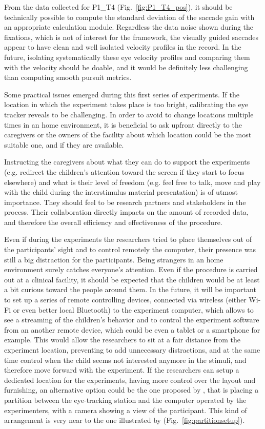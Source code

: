 From the data collected for P1\_T4 (Fig.~\ref{fig:P1_T4_pos}), it should be technically possible to compute the standard deviation of the saccade gain with an appropriate calculation module. Regardless the data noise shown during the fixations, which is not of interest for the framework, the visually guided saccades appear to have clean and well isolated velocity profiles in the record. In the future, isolating systematically these eye velocity profiles and comparing them with the velocity should be doable, and it would be definitely less challenging than computing smooth pursuit metrics.

Some practical issues emerged during this first series of experiments. If the location in which the experiment takes place is too bright, calibrating the eye tracker reveals to be challenging. In order to avoid to change locations multiple times in an home environment, it is beneficial to ask upfront directly to the caregivers or the owners of the facility about which location could be the most suitable one, and if they are available.

Instructing the caregivers about what they can do to support the experiments (e.g. redirect the children’s attention toward the screen if they start to focus elsewhere) and what is their level of freedom (e.g. feel free to talk, move and play with the child during the interstimulus material presentation) is of utmost importance. They should feel to be research partners and stakeholders in the process. Their collaboration directly impacts on the amount of recorded data, and therefore the overall efficiency and effectiveness of the procedure.

Even if during the experiments the researchers tried to place themselves out of the participants’ sight and to control remotely the computer, their presence was still a big distraction for the participants. Being strangers in an home environment surely catches everyone's attention. Even if the procedure is carried out at a clinical facility, it should be expected that the children would be at least a bit curious toward the people around them. In the future, it will be important to set up a series of remote controlling devices, connected via wireless (either Wi-Fi or even better local Bluetooth) to the experiment computer, which allows to see a streaming of the children’s behavior and to control the experiment software from an another remote device, which could be even a tablet or a smartphone for example. This would allow the researchers to sit at a fair distance from the experiment location, preventing to add unnecessary distractions, and at the same time control when the child seems not interested anymore in the stimuli, and therefore move forward with the experiment. If the researchers can setup a dedicated location for the experiments, having more control over the layout and furnishing, an alternative option could be the one proposed by \cite{sasson2012children}, that is placing a partition between the eye-tracking station and the computer operated by the experimenters, with a camera showing a view of the participant. This kind of arrangement is very near to the one illustrated by \cite{anderson2006visualscanning}(Fig.~\ref{fig:partitionsetup}).


